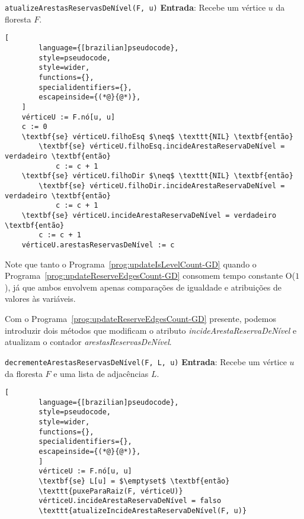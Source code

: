 \begin{programruledcaption}{\texttt{atualizeArestasReservasDeNível(F, u)} \label{prog:updateReserveEdgesCount-GD}}
    \noindent\textbf{Entrada}: Recebe um vértice $u$ da floresta $F$.
    \vspace{-0.5\baselineskip}
    \begin{lstlisting}[
        language={[brazilian]pseudocode},
        style=pseudocode,
        style=wider,
        functions={},
        specialidentifiers={},
        escapeinside={(*@}{@*)},
    ]
    vérticeU := F.nó[u, u]
    c := 0
    \textbf{se} vérticeU.filhoEsq $\neq$ \texttt{NIL} \textbf{então}
        \textbf{se} vérticeU.filhoEsq.incideArestaReservaDeNível = verdadeiro \textbf{então}
            c := c + 1
    \textbf{se} vérticeU.filhoDir $\neq$ \texttt{NIL} \textbf{então}
        \textbf{se} vérticeU.filhoDir.incideArestaReservaDeNível = verdadeiro \textbf{então}
            c := c + 1
    \textbf{se} vérticeU.incideArestaReservaDeNível = verdadeiro \textbf{então}
        c := c + 1
    vérticeU.arestasReservasDeNível := c
    \end{lstlisting}
    \vspace{-0.5\baselineskip}
\end{programruledcaption}
Note que tanto o Programa~\ref{prog:updateIsLevelCount-GD} quando o Programa~\ref{prog:updateReserveEdgesCount-GD} consomem tempo constante O($1$), já que ambos envolvem apenas comparações de igualdade e atribuições de valores às variáveis.

Com o Programa~\ref{prog:updateReserveEdgesCount-GD} presente, podemos introduzir dois métodos que modificam o atributo \textit{incideArestaReservaDeNível} e atualizam o contador \textit{arestasReservasDeNível}.

\begin{programruledcaption}{\texttt{decrementeArestasReservasDeNível(F, L, u)} \label{prog:decrementReserveEdgesCount-GD}}
    \noindent\textbf{Entrada}: Recebe um vértice $u$ da floresta $F$ e uma lista de adjacências $L$.
    \vspace{-0.5\baselineskip}
    \begin{lstlisting}[
        language={[brazilian]pseudocode},
        style=pseudocode,
        style=wider,
        functions={},
        specialidentifiers={},
        escapeinside={(*@}{@*)},
        ]
        vérticeU := F.nó[u, u]
        \textbf{se} L[u] = $\emptyset$ \textbf{então} 
        \texttt{puxeParaRaiz(F, vérticeU)}
        vérticeU.incideArestaReservaDeNível = falso
        \texttt{atualizeIncideArestaReservaDeNível(F, u)}
    \end{lstlisting}
    \vspace{-0.5\baselineskip}
\end{programruledcaption}


